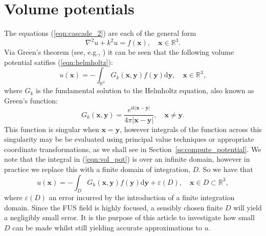 \documentclass[preprint]{JASA}
\newcommand{\sd}{\mbox{d}}
\newcommand{\bx}{\mathbf{x}}
\newcommand{\by}{\mathbf{y}}
\newcommand{\red}[1]{{\color{red} #1}}
\begin{document}
\section{Volume potentials}
\label{sec:volume}
The equations (\ref{eqn:cascade_2}) are each of the general form
\begin{equation}
    \nabla^2 u + k^2 u = f(\bx), \quad \bx\in\mathbb{R}^3.
    \label{eqn:helmholtz}
\end{equation}
Via Green's theorem (see, e.g., \cite{colton2013integral,costabel2015spectrum})
it can be seen that the following volume potential satifies (\ref{eqn:helmholtz}):
\begin{equation}
    u(\bx) = -\int_{\mathbb{R}^3}G_k(\bx,\by)f(\by)\sd \by, \quad \bx\in\mathbb{R}^3,
    \label{eqn:vol_pot}
\end{equation}
where $G_k$ is the fundamental solution to the Helmholtz equation, also known as 
Green's function:
\begin{equation}
    G_k(\bx,\by)=\frac{e^{\text{i} k|\bx-\by|}}{4\pi|\bx-\by|},\quad \bx\neq\by.
    \label{eqn:green}
\end{equation}
\red{This function is singular when $\bx=\by$, however integrals of the function
across this singularity may be be evaluated using principal value techniques or 
appropriate coordinate transformations, as we shall see in Section~\ref{ss:compute_potential}.}
We note that the integral in (\ref{eqn:vol_pot}) is over an infinite domain, 
however in practice we replace this with a finite domain of integration, $D$.
So we have that 
\begin{equation}
    u(\bx) = -\int_{D}G_k(\bx,\by)f(\by)\sd \by + \varepsilon(D), \quad \bx\in D\subset\mathbb{R}^3,
    \label{eqn:vol_pot_approx}
\end{equation}
where $\varepsilon(D)$ an error incurred by the introduction of a finite integration
domain. Since the \red{FUS} field is highly focused, a sensibly chosen finite $D$ will 
yield a negligibly small error. It is the purpose of this article to investigate how small $D$ 
can be made whilst still yielding accurate approximations to $u$.
\end{document}

